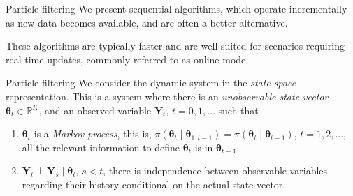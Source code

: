 \documentclass[12pt, compress]{beamer}
\begin{document}
\begin{frame}{Particle filtering}
We present sequential algorithms, which operate incrementally as new data becomes available, and are often a better alternative. 

These algorithms are typically faster and are well-suited for scenarios requiring real-time updates, commonly referred to as online mode.
\end{frame}

\begin{frame}{Particle filtering}
We consider the dynamic system in the \textit{state-space} representation. This is a system where there is an \textit{unobservable state vector} $\bm{\theta}_t\in\mathbb{R}^K$, and an observed variable $\bm{Y}_t$, $t=0,1,\dots$ such that
\begin{enumerate}
	\item $\bm{\theta}_t$ is a \textit{Markov process}, this is, $\pi(\bm{\theta}_{t}\mid \bm{\theta}_{1:t-1})=\pi(\bm{\theta}_{t}\mid \bm{\theta}_{t-1})$, $t=1,2,\dots$, all the relevant information to define $\bm{\theta}_{t}$ is in $\bm{\theta}_{t-1}$.
	\item $\bm{Y}_t\perp \bm{Y}_s\mid \bm{\theta}_{t}$, $s<t$, there is independence between observable variables regarding their history conditional on the actual state vector. 
\end{enumerate}
\end{frame}
\end{document}
